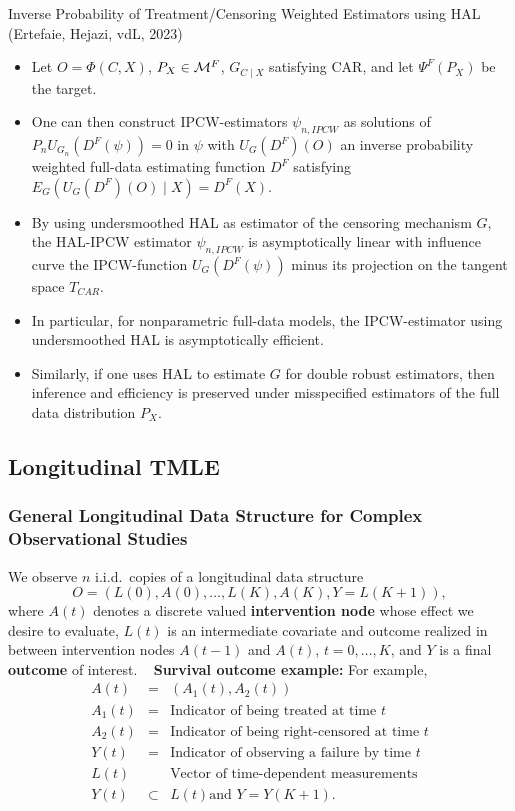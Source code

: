 \documentclass[t]{beamer}
\begin{document}
\begin{frame}{Inverse Probability of Treatment/Censoring Weighted Estimators using HAL (Ertefaie, Hejazi, vdL, 2023)}
\begin{itemize}
\item Let $O=\Phi(C,X)$, $P_X\in {\cal M}^F$, $G_{C\mid X}$ satisfying CAR, and let $\Psi^F(P_X) $ be the target.
\item One can then construct IPCW-estimators $\psi_{n,IPCW}$ as solutions of $P_n U_{G_n}(D^F(\psi))=0$ in $\psi$ with $U_G(D^F)(O)$ an inverse probability weighted full-data estimating function $D^F$ satisfying $E_G(U_G(D^F)(O)\mid X)=D^F(X)$.
\item By using undersmoothed HAL as estimator of the censoring mechanism $G$, the HAL-IPCW estimator $\psi_{n,IPCW}$  is asymptotically linear with influence curve the IPCW-function $U_G(D^F(\psi))$ minus its projection on the tangent space $T_{CAR}$.
\end{itemize}
\end{frame}

\begin{frame}
\begin{itemize}
\item In particular, for nonparametric full-data models, the IPCW-estimator using undersmoothed HAL is asymptotically efficient.
\item Similarly, if one uses HAL to estimate $G$ for double robust estimators, then inference and efficiency is preserved under misspecified estimators of the full data distribution $P_X$.
\end{itemize}
\end{frame}

\subsection{Longitudinal TMLE}

\begin{frame}
\frametitle{General Longitudinal Data Structure for Complex Observational Studies}
We observe $n$ i.i.d.~copies of a longitudinal data structure
\[
O=(L(0),A(0),\ldots,L(K),A(K),Y=L(K+1)),\]
where $A(t)$ denotes a discrete valued {\bf intervention node} whose effect we
desire to evaluate,  $L(t)$ is an intermediate covariate and outcome realized in
between intervention nodes $A(t-1)$ and $A(t)$, $t=0,\ldots,K$, and $Y$ is
a final {\bf outcome} of interest.
\ \newline
{\bf Survival outcome example:}
For example,
\begin{eqnarray*}
A(t)&=&(A_1(t),A_2(t))\\
A_1(t)&=& \mbox{Indicator of being treated at time $t$}\\
A_2(t)&=& \mbox{Indicator of being right-censored at time $t$}\\
Y(t)&=&\mbox{Indicator of observing a failure by time $t$}\\
L(t)&&\mbox{Vector of time-dependent measurements}\\
Y(t)&\subset& L(t)\mbox{and  $Y=Y(K+1)$}.
\end{eqnarray*}
\end{frame}
\end{document}
